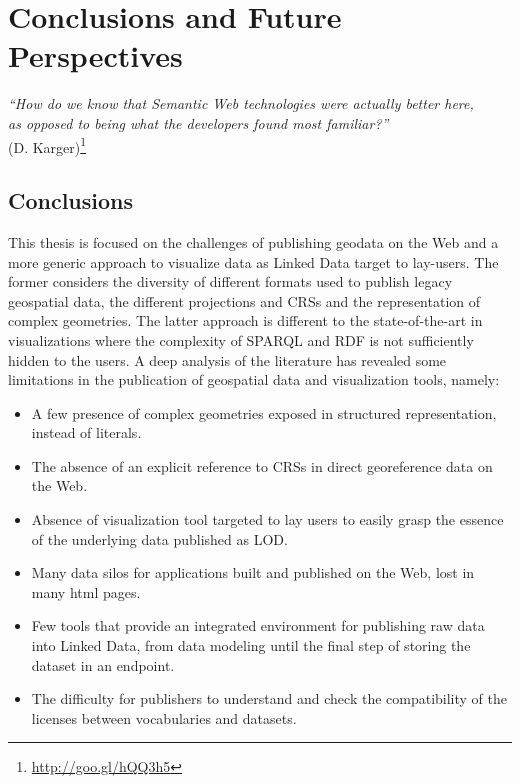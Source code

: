 \chapter{Conclusions and Future Perspectives}
\label{ch:conc}
\begin{flushright}
\textit{``How do we know that Semantic Web technologies were actually better here, \\as opposed to being what the developers found most familiar?''} \\ (D. Karger)\footnote{\url{http://goo.gl/hQQ3h5}}
\end{flushright}


\section{Conclusions}
\label{sec:final}

This thesis is focused on the challenges of publishing geodata on the Web and a more generic approach to visualize data as Linked Data target to lay-users. The former considers the diversity of different formats used to publish legacy geospatial data, the different projections and CRSs and the representation of complex geometries. The latter approach is different to the state-of-the-art in visualizations where the complexity of SPARQL and RDF is not sufficiently hidden to the users. A deep analysis of the literature has revealed some limitations in the publication of geospatial data and visualization tools, namely:
\begin{itemize}
\item A few presence of complex geometries exposed in structured representation, instead of literals. 
\item The absence of an explicit reference to CRSs in direct georeference data on the Web.
\item Absence of visualization tool targeted to lay users to easily grasp the essence of the underlying data published as LOD.  
\item Many data silos for applications built and published on the Web, lost in many html pages.
\item Few tools that provide an integrated environment for publishing raw data into Linked Data, from data modeling until the final step of storing the dataset in an endpoint.
\item The difficulty for publishers to understand and check the compatibility of the licenses between vocabularies and datasets.
  
\end{itemize}

